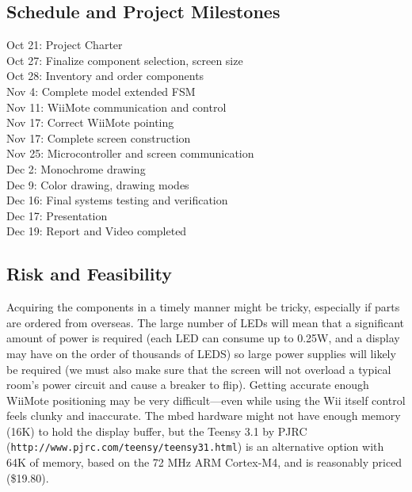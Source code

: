 \documentclass[letterpaper]{article}
\begin{document}
\subsection*{Schedule and Project Milestones}
\begin{multicols}{2}
    \noindent Oct 21: Project Charter\\
    Oct 27: Finalize component selection, screen size\\
    Oct 28: Inventory and order components\\
    Nov 4: Complete model extended FSM\\
    Nov 11: WiiMote communication and control\\
    Nov 17: Correct WiiMote pointing\\
    Nov 17: Complete screen construction\\
    Nov 25: Microcontroller and screen communication\\
    Dec 2: Monochrome drawing\\
    Dec 9: Color drawing, drawing modes\\
    Dec 16: Final systems testing and verification\\
    Dec 17: Presentation\\
    Dec 19: Report and Video completed


\end{multicols}

\subsection*{Risk and Feasibility}
Acquiring the components in a timely manner might be tricky, especially if
parts are ordered from overseas. The large number of LEDs will mean that a
significant amount of power is required (each LED can consume up to 0.25W, and
a display may have on the order of thousands of LEDS) so large power supplies
will likely be required (we must also make sure that the screen will not
overload a typical room's power circuit and cause a breaker to flip). Getting
accurate enough WiiMote positioning may be very difficult---even while
using the Wii itself control feels clunky and inaccurate. The mbed hardware
might not have enough memory (16K) to hold the display buffer, but the Teensy 3.1
by PJRC (\texttt{http://www.pjrc.com/teensy/teensy31.html})
is an alternative option with 64K of memory, based on the 72 MHz ARM
Cortex-M4, and is reasonably priced (\$19.80).
\end{document}
